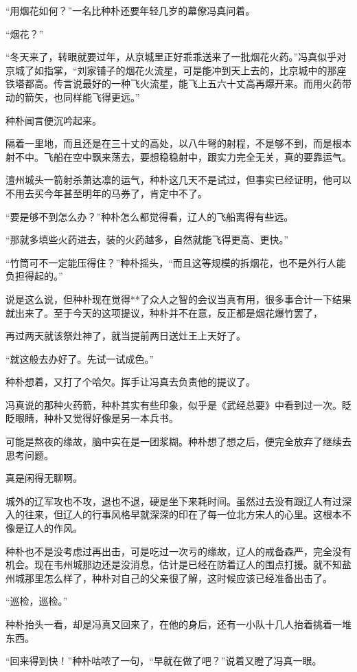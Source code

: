 “用烟花如何？”一名比种朴还要年轻几岁的幕僚冯真问着。

“烟花？”

“冬天来了，转眼就要过年，从京城里正好乖乖送来了一批烟花火药。”冯真似乎对京城了如指掌，“刘家铺子的烟花火流星，可是能冲到天上去的，比京城中的那座铁塔都高。传言说最好的一种飞火流星，能飞上五六十丈高再爆开来。而用火药带动的箭矢，也同样能飞得更远。”

种朴闻言便沉吟起来。

隔着一里地，而且还是在三十丈的高处，以八牛弩的射程，不是够不到，而是根本射不中。飞船在空中飘来荡去，要想稳稳射中，跟实力完全无关，真的要靠运气。

澶州城头一箭射杀萧达凛的运气，种朴这几天不是试过，但事实已经证明，他可以不用去买今年甚至明年的马券了，肯定中不了。

“要是够不到怎么办？”种朴怎么都觉得看，辽人的飞船离得有些远。

“那就多填些火药进去，装的火药越多，自然就能飞得更高、更快。”

“竹筒可不一定能压得住？”种朴摇头，“而且这等规模的拆烟花，也不是外行人能负担得起的。”

说是这么说，但种朴现在觉得**了众人之智的会议当真有用，很多事合计一下结果就出来了。至于今天的这项提议，种朴并不在意，反正都是烟花爆竹罢了，

再过两天就该祭灶神了，就当提前两日送灶王上天好了。

“就这般去办好了。先试一试成色。”

种朴想着，又打了个哈欠。挥手让冯真去负责他的提议了。

冯真说的那种火药箭，种朴其实有些印象，似乎是《武经总要》中看到过一次。眨眨眼睛，种朴又觉得好像是另一本兵书。

可能是熬夜的缘故，脑中实在是一团浆糊。种朴想了想之后，便完全放弃了继续去思考问题。

真是闲得无聊啊。

城外的辽军攻也不攻，退也不退，硬是坐下来耗时间。虽然过去没有跟辽人有过深入的往来，但辽人的行事风格早就深深的印在了每一位北方宋人的心里。这根本不像是辽人的作风。

种朴也不是没考虑过再出击，可是吃过一次亏的缘故，辽人的戒备森严，完全没有机会。现在韦州城那边还是没消息，估计是已经在防着辽人的围点打援。就不知盐州城那里怎么样了，种朴对自己的父亲很了解，这时候应该已经准备出击了。

“巡检，巡检。”

种朴抬头一看，却是冯真又回来了，在他的身后，还有一小队十几人抬着挑着一堆东西。

“回来得到快！”种朴咕哝了一句，“早就在做了吧？”说着又瞪了冯真一眼。


